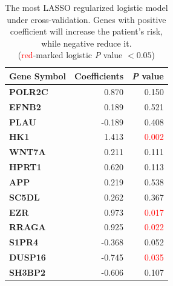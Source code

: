 \documentclass[preprint,12pt]{elsarticle}
\newenvironment{MyColorPar}[1]{%
    \leavevmode\color{#1}\ignorespaces%
}{%
}%
\begin{document}
\begin{MyColorPar}{blue}
\begin{table}[ht]
\centering
\caption{The most LASSO regularized logistic model under cross-validation. Genes with positive coefficient will increase the patient's risk, while negative reduce it.\\
    (\textcolor{red}{red}-marked logistic \textit{P} value $< 0.05$)}
\label{tab:signature4}
\begin{tabular}{lrr}
\textbf{Gene Symbol} & \textbf{Coefficients} &  \textbf{\textit{P} value} \\ \hline
\textbf{POLR2C}      & 0.870                 & 0.150                              \\
\textbf{EFNB2}       & 0.189                 & 0.521                              \\
\textbf{PLAU}        & -0.189                & 0.408                              \\
\textbf{HK1}         & 1.413                 & \textcolor{red}{0.002}       \\
\textbf{WNT7A}       & 0.211                 & 0.111                              \\
\textbf{HPRT1}       & 0.620                 & 0.113                              \\
\textbf{APP}         & 0.219                 & 0.538                              \\
\textbf{SC5DL}       & 0.262                 & 0.367                              \\
\textbf{EZR}         & 0.973                 & \textcolor{red}{0.017}       \\
\textbf{RRAGA}       & 0.925                 & \textcolor{red}{0.022}       \\
\textbf{S1PR4}       & -0.368                & 0.052                              \\
\textbf{DUSP16}      & -0.745                & \textcolor{red}{0.035}       \\
\textbf{SH3BP2}      & -0.606                & 0.107                             
\end{tabular}
\end{table}



\end{MyColorPar}
\end{document}
